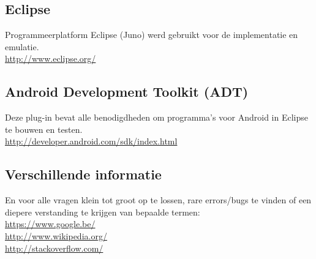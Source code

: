 \documentclass[11pt,a4paper]{article}
\begin{document}
\subsection{Eclipse}
Programmeerplatform Eclipse (Juno) werd gebruikt voor de implementatie en emulatie.	\\
\url{http://www.eclipse.org/}

\subsection{Android Development Toolkit (ADT)}
Deze plug-in bevat alle benodigdheden om programma's voor Android in Eclipse te bouwen en testen.\\
\url{http://developer.android.com/sdk/index.html}

\subsection{Verschillende informatie}
En voor alle vragen klein tot groot op te lossen, rare errors/bugs te vinden of een diepere verstanding te krijgen van bepaalde termen:\\
\url{https://www.google.be/} \\
\url{http://www.wikipedia.org/} \\
\url{http://stackoverflow.com/}
\end{document}
